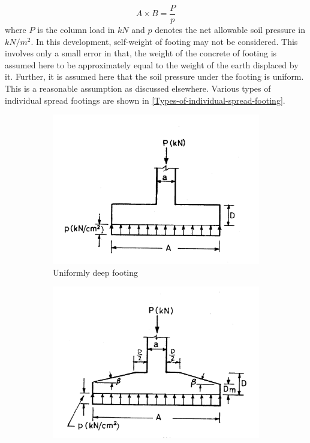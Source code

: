 \begin{equation}
\label{eq:footingArea}
A \times B = \frac{P}{p}
\end{equation}
where $P$ is the column load in $kN$ and $p$ denotes the net allowable soil
pressure in $kN/m^2$. In this development, self-weight of footing may not
be considered. This involves only a small error in that, the weight of the
concrete of footing is assumed here to be approximately equal to the weight
of the earth displaced by it. Further, it is assumed here that the soil
pressure under the footing is uniform. This is a reasonable assumption as
discussed elsewhere. Various types of  individual spread footings are shown in \figmacro \ref{Types-of-individual-spread-footing}.
\begin{figure}
\begin{subfigure}[b]{0.5\textwidth}
  \includegraphics[width=\textwidth]{images/fig2291.png}
    \caption{Uniformly deep footing}
    \label{uniformdeepfooting}
  \end{subfigure}
  \begin{subfigure}[b]{0.5\textwidth}
    \includegraphics[width=\textwidth]{images/fig2292.png}

\end{subfigure}
\end{figure}
